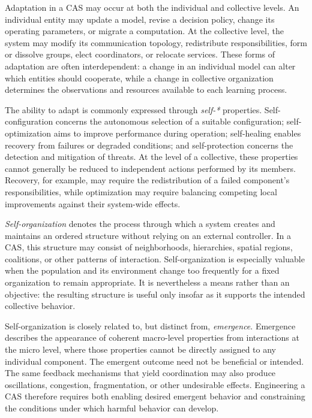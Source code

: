 Adaptation in a \gls{CAS} may occur at both the individual and collective levels. 
%
An individual entity may update a model, revise a decision policy, 
 change its operating parameters, or migrate a computation. 
% 
At the collective level, 
 the system may modify its communication topology, redistribute responsibilities,
 form or dissolve groups, elect coordinators, or relocate services. 
% 
These forms of adaptation are often interdependent: 
 a change in an individual model can alter which entities should cooperate, 
 while a change in collective organization determines the observations 
 and resources available to each learning process.

The ability to adapt is commonly expressed through \emph{self-*} properties.
%
Self-configuration concerns the autonomous selection of a suitable configuration; 
 self-optimization aims to improve performance during operation;
 self-healing enables recovery from failures or degraded conditions; and
 self-protection concerns the detection and mitigation of threats. 
% 
At the level of a collective, 
 these properties cannot generally be reduced to independent actions performed by its members. 
% 
Recovery, for example, 
 may require the redistribution of a failed component's responsibilities, 
 while optimization may require balancing competing local improvements 
 against their system-wide effects.

\emph{Self-organization} 
 denotes the process through which a system creates 
 and maintains an ordered structure without relying on an external controller. 
% 
In a \gls{CAS}, 
 this structure may consist of neighborhoods, hierarchies, spatial regions, coalitions, 
 or other patterns of interaction. 
% 
Self-organization is especially valuable when the population 
 and its environment change too frequently for a fixed organization to remain appropriate. 
% 
It is nevertheless a means rather than an objective: 
 the resulting structure is useful only insofar as it supports the intended collective behavior.

Self-organization is closely related to, but distinct from, \emph{emergence}.
%
Emergence describes the appearance of coherent macro-level properties 
 from interactions at the micro level, 
 where those properties cannot be directly assigned to any individual component. 
% 
The emergent outcome need not be beneficial or intended. 
%
The same feedback mechanisms that yield coordination may also produce 
oscillations, congestion, fragmentation, or other undesirable effects. 
%
Engineering a \gls{CAS} therefore requires both enabling desired emergent
 behavior and constraining the conditions under which harmful behavior can develop.

